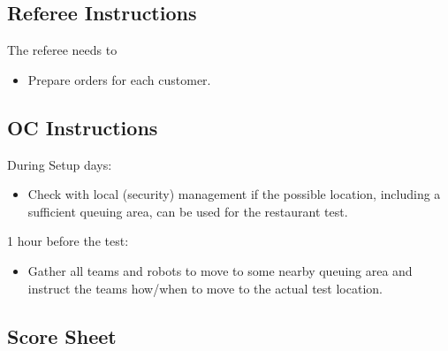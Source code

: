 \subsection*{Referee Instructions}
The referee needs to
\begin{itemize}
	\item Prepare orders for each customer.
\end{itemize}


\subsection*{OC Instructions}
During Setup days:
\begin{itemize}[nosep]
	\item Check with local (security) management if the possible location, including a sufficient queuing area, can be used for the restaurant test.
\end{itemize}
1 hour before the test:
\begin{itemize}[nosep]
	\item Gather all teams and robots to move to some nearby queuing area and instruct the teams how/when to move to the actual test location.
\end{itemize}


\subsection*{Score Sheet}



